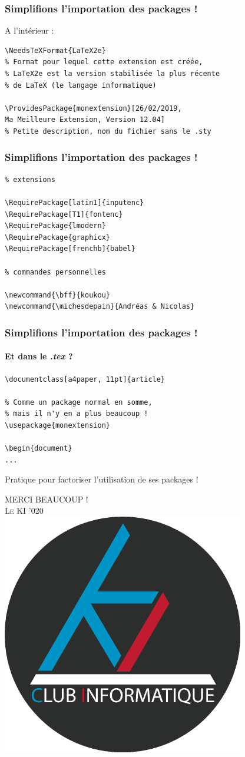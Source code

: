 \documentclass[handout]{beamer}
\begin{document}
\begin{frame}[fragile=singleslide]
\frametitle{Simplifions l'importation des packages !}
A l'intérieur :\\
\begin{verbatim}
\NeedsTeXFormat{LaTeX2e} 
% Format pour lequel cette extension est créée,
% LaTeX2e est la version stabilisée la plus récente 
% de LaTeX (le langage informatique)

\ProvidesPackage{monextension}[26/02/2019, 
Ma Meilleure Extension, Version 12.04] 
% Petite description, nom du fichier sans le .sty
\end{verbatim}
\end{frame}

\begin{frame}[fragile=singleslide]
\frametitle{Simplifions l'importation des packages !}
\begin{verbatim}
% extensions

\RequirePackage[latin1]{inputenc}
\RequirePackage[T1]{fontenc}
\RequirePackage{lmodern}
\RequirePackage{graphicx}
\RequirePackage[frenchb]{babel}

% commandes personnelles

\newcommand{\bff}{koukou}
\newcommand{\michesdepain}{Andréas & Nicolas}
\end{verbatim}
\end{frame}

\begin{frame}[fragile=singleslide]
\frametitle{Simplifions l'importation des packages !}
\framesubtitle{Et dans le \textit{.tex} ?}
\begin{verbatim}
\documentclass[a4paper, 11pt]{article}

% Comme un package normal en somme, 
% mais il n'y en a plus beaucoup !
\usepackage{monextension} 

\begin{document}
...
\end{verbatim}


\centering 
Pratique pour factoriser l'utilisation de ses packages !

\end{frame}


\begin{frame}
	\centering
	\Huge
	\textsc{MERCI BEAUCOUP !}\\
	\vspace*{2cm}
	\normalsize
	\textsc{Le KI '020}\\
	\vspace*{1cm}
	\centering
	\includegraphics[scale=0.2]{logo-ki.png}
\end{frame}
\end{document}
